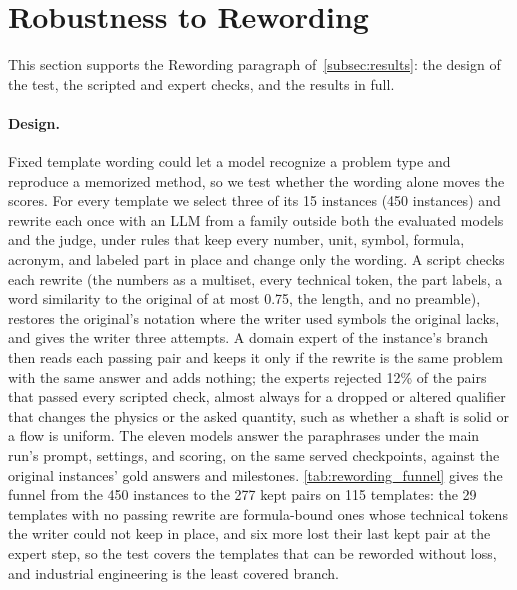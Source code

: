 \section{Robustness to Rewording}
\label{appendix:rewording}

This section supports the Rewording paragraph of~\autoref{subsec:results}: the design of the test,
the scripted and expert checks, and the results in full.

\paragraph{Design.}
Fixed template wording could let a model recognize a problem type and reproduce a memorized method,
so we test whether the wording alone moves the scores.
For every template we select three of its 15 instances (450 instances) and rewrite each once with an
LLM from a family outside both the evaluated models and the judge, under rules that keep every
number, unit, symbol, formula, acronym, and labeled part in place and change only the wording.
A script checks each rewrite (the numbers as a multiset, every technical token, the part labels, a
word similarity to the original of at most 0.75, the length, and no preamble), restores the
original's notation where the writer used symbols the original lacks, and gives the writer three
attempts.
A domain expert of the instance's branch then reads each passing pair and keeps it only if the
rewrite is the same problem with the same answer and adds nothing; the experts rejected 12\% of the
pairs that passed every scripted check, almost always for a dropped or altered qualifier that
changes the physics or the asked quantity, such as whether a shaft is solid or a flow is uniform.
The eleven models answer the paraphrases under the main run's prompt, settings, and scoring, on the
same served checkpoints, against the original instances' gold answers and milestones.
\autoref{tab:rewording_funnel} gives the funnel from the 450 instances to the 277 kept pairs on 115
templates: the 29 templates with no passing rewrite are formula-bound ones whose technical tokens
the writer could not keep in place, and six more lost their last kept pair at the expert step, so
the test covers the templates that can be reworded without loss, and industrial engineering is the
least covered branch.

